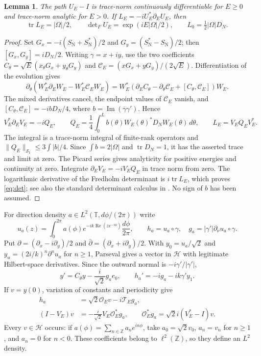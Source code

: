\documentclass[11pt]{amsart}
\numberwithin{equation}{section}
\newtheorem{lemma}{Lemma}[section]
\newcommand{\HH}{\mathscr H}
\newcommand{\T}{\mathbb T}
\newcommand{\SN}{S_{\mathrm N}}
\newcommand{\OO}{\mathcal O}
\newcommand{\TT}{\mathcal T}
\newcommand{\tr}{\operatorname{tr}}
\newcommand{\norm}[1]{\lVert #1\rVert}
\begin{document}
\begin{lemma}\label{lem:area}
The path $U_E-I$ is trace-norm continuously differentiable for $E\ge0$
and trace-norm analytic for $E>0$. If $L_E=-iU_E^*\partial_EU_E$, then
\begin{equation}\label{eq:det}
 \tr L_E=|\Omega|/2,\qquad
 \det\nolimits_F U_E=\exp(iE|\Omega|/2),\qquad
 L_0=\tfrac12|\Omega|D_N.
\end{equation}
\end{lemma}
\begin{proof}
Set $G_x=-i(\SN+\SN^*)/2$ and $G_y=(\SN^*-\SN)/2$; then
$[G_x,G_y]=iD_N/2$. Writing $\gamma=x+iy$, use the two coefficients
$C_\theta=\sqrt E(x_\theta G_x+y_\theta G_y)$ and
$\mathcal C_E=(xG_x+yG_y)/(2\sqrt E)$. Differentiation of the evolution gives
\[
 \partial_\theta(W_E^*\partial_EW_E-W_E^*\mathcal C_EW_E)
 =W_E^*(\partial_EC_\theta-\partial_\theta \mathcal C_E+[C_\theta,\mathcal C_E])W_E.
\]
The mixed derivatives cancel, the endpoint values of $\mathcal C_E$ vanish, and
$[C_\theta,\mathcal C_E]=-ibD_N/4$, where
$b=\operatorname{Im}(\overline\gamma\gamma')$. Hence
\begin{equation}\label{eq:curvature}
 V_E^*\partial_EV_E=-iQ_E,\qquad
 Q_E=\frac14\int_0^L b(\theta)W_E(\theta)^*D_NW_E(\theta)\,d\theta,
 \qquad L_E=V_EQ_EV_E^*.
\end{equation}
The integral is a trace-norm integral of finite-rank operators and
$\norm{Q_E}_{\mathcal S_1}\le3\int|b|/4$. Since
$\int b=2|\Omega|$ and $\tr D_N=1$, it has the asserted trace and limit
at zero. The Picard series gives analyticity for positive energies and
continuity at zero. Integrate $\partial_EV_E=-iV_EQ_E$ in trace norm
from zero. The logarithmic derivative of the Fredholm determinant is
$i\tr L_E$, which proves \eqref{eq:det}; see also the standard determinant
calculus in \cite{Simon}. No sign of $b$ has been assumed.
\end{proof}

For direction density $a\in L^2(\T,d\phi/(2\pi))$ write
\[
 u_a(z)=\int_0^{2\pi}a(\phi)e^{-ik\operatorname{Re}(ze^{-i\phi})}
                   \frac{d\phi}{2\pi},\qquad
 h_a=u_a\circ\gamma,\quad g_a=|\gamma'|\partial_\nu u_a\circ\gamma.
\]
Put $\partial=(\partial_x-i\partial_y)/2$ and
$\bar\partial=(\partial_x+i\partial_y)/2$. With
$y_0=u_a/\sqrt2$ and $y_n=(2i/k)^n\partial^n u_a$ for $n\ge1$,
Parseval gives a vector in $\HH$ with legitimate Hilbert-space derivatives.
Since the outward normal is $-i\gamma'/|\gamma'|$,
\begin{equation}\label{eq:driven}
 y'=C_\theta y-\frac i{\sqrt2}g_ae_0,
 \qquad h_a'= -ig_a-ik\gamma'y_1.
\end{equation}
If $v=y(0)$, variation of constants and periodicity give
\begin{align}
 h_a&=\sqrt2\OO_Ev-i\TT_Eg_a,\label{eq:trace-driven}\\
 (I-V_E)v&=-\frac i{\sqrt2}V_E\OO_E^*g_a,
 \qquad \OO_E^*g_a=\sqrt2 i(V_E^*-I)v.\label{eq:endpoint}
\end{align}
Every $v\in\HH$ occurs: if
$a(\phi)=\sum_{n\in\mathbb Z}a_ne^{in\phi}$, take
$a_0=\sqrt2v_0$, $a_n=v_n$ for $n\ge1$, and $a_n=0$ for $n<0$.
These coefficients belong to $\ell^2(\mathbb Z)$, so they define an
$L^2$ density.
\end{document}
